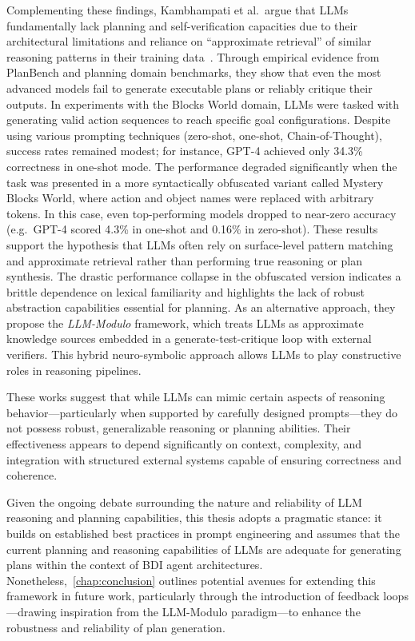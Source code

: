 \documentclass[12pt,a4paper,openright,twoside]{book}
\begin{document}
Complementing these findings, Kambhampati et al.\ argue that LLMs fundamentally lack planning and self-verification capacities due to their architectural limitations and reliance on ``approximate retrieval'' of similar reasoning patterns in their training data~\cite{kambhampatiCanLargeLanguage2024, kambhampatiLLMsCantPlan2024}.
%
Through empirical evidence from PlanBench and planning domain benchmarks, they show that even the most advanced models fail to generate executable plans or reliably critique their outputs. 
%
In experiments with the Blocks World domain, \acp{LLM} were tasked with generating valid action sequences to reach specific goal configurations.
%
Despite using various prompting techniques (zero-shot, one-shot, Chain-of-Thought), success rates remained modest; for instance, GPT-4 achieved only 34.3\% correctness in one-shot mode.
%
The performance degraded significantly when the task was presented in a more syntactically obfuscated variant called Mystery Blocks World, where action and object names were replaced with arbitrary tokens.
%
In this case, even top-performing models dropped to near-zero accuracy (e.g.\, GPT-4 scored 4.3\% in one-shot and 0.16\% in zero-shot).
%
These results support the hypothesis that LLMs often rely on surface-level pattern matching and approximate retrieval rather than performing true reasoning or plan synthesis. 
%
The drastic performance collapse in the obfuscated version indicates a brittle dependence on lexical familiarity and highlights the lack of robust abstraction capabilities essential for planning.
%
As an alternative approach, they propose the \textit{LLM-Modulo} framework, which treats LLMs as approximate knowledge sources embedded in a generate-test-critique loop with external verifiers. This hybrid neuro-symbolic approach allows LLMs to play constructive roles in reasoning pipelines.

These works suggest that while LLMs can mimic certain aspects of reasoning behavior---particularly when supported by carefully designed prompts---they do not possess robust, generalizable reasoning or planning abilities.
%
Their effectiveness appears to depend significantly on context, complexity, and integration with structured external systems capable of ensuring correctness and coherence.

Given the ongoing debate surrounding the nature and reliability of \ac{LLM} reasoning and planning capabilities, this thesis adopts a pragmatic stance: it builds on established best practices in prompt engineering and assumes that the current planning and reasoning capabilities of \acp{LLM} are adequate for generating plans within the context of BDI agent architectures.
%
Nonetheless,~\cref{chap:conclusion} outlines potential avenues for extending this framework in future work, particularly through the introduction of feedback loops---drawing inspiration from the LLM-Modulo paradigm---to enhance the robustness and reliability of plan generation.
\end{document}
